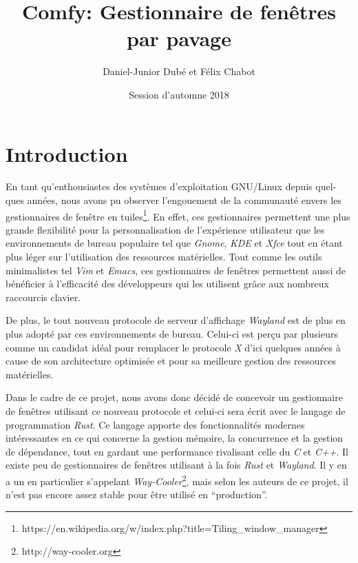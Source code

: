 \documentclass[titlepage]{article}
\title{Comfy: Gestionnaire de fenêtres par pavage}
\author{Daniel-Junior Dubé et Félix Chabot}
\date{Session d'automne 2018}
\begin{document}
\maketitle

\renewcommand{\contentsname}{Table des matières}
\tableofcontents
\newpage

\section{Introduction}
\par
\bigskip
En tant qu'enthousiastes des systèmes d'exploitation GNU/Linux depuis quel-ques années, nous avons pu observer l’engouement de la communauté envers les gestionnaires de fenêtre en tuiles\footnote{https://en.wikipedia.org/w/index.php?title=Tiling\_window\_manager}. En effet, ces gestionnaires permettent une plus grande flexibilité pour la personnalisation de l’expérience utilisateur que les environnements de bureau populaire tel que \textit{Gnome}, \textit{KDE} et \textit{Xfce} tout en étant plus léger sur l’utilisation des ressources matérielles. Tout comme les outils minimalistes tel \textit{Vim} et \textit{Emacs}, ces gestionnaires de fenêtres permettent aussi de bénéficier à l’efficacité des développeurs qui les utilisent grâce aux nombreux raccourcis clavier.

\par
\bigskip
De plus, le tout nouveau protocole de serveur d'affichage \textit{Wayland} est de plus en plus adopté par ces environnements de bureau. Celui-ci est perçu par plusieurs comme un candidat idéal pour remplacer le protocole \textit{X} d'ici quelques années à cause de son architecture optimisée et pour sa meilleure gestion des ressources matérielles.

\par
\bigskip
Dans le cadre de ce projet, nous avons donc décidé de concevoir un gestionnaire de fenêtres utilisant ce nouveau protocole et celui-ci sera écrit avec le langage de programmation \textit{Rust}. Ce langage apporte des fonctionnalités modernes intéressantes en ce qui concerne la gestion mémoire, la concurrence et la gestion de dépendance, tout en gardant une performance rivalisant celle du \textit{C} et \textit{C++}. Il existe peu de gestionnaires de fenêtres utilisant à la fois \textit{Rust} et \textit{Wayland}. Il y en a un en particulier s’appelant \textit{Way-Cooler}\footnote{http://way-cooler.org}, mais selon les auteurs de ce projet, il n’est pas encore assez stable pour être utilisé en “production”.
\end{document}
